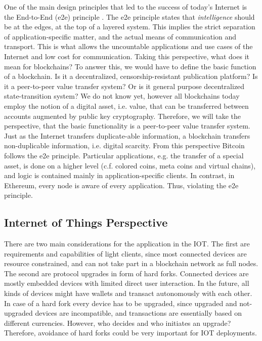 {One of the main design principles that led to the success of today's Internet is the End-to-End (e2e) principle \parencite{Saltzer:1984:EAS:357401.357402}. The e2e principle states that \emph{intelligence} should be at the edges, at the top of a layered system. This implies the strict separation of application-specific matter, and the actual means of communication and transport. This is what allows the uncountable applications and use cases of the Internet and low cost for communication. Taking this perspective, what does it mean for blockchains? To answer this, we would have to define the basic function of a blockchain. Is it a decentralized, censorship-resistant publication platform? Is it a peer-to-peer value transfer system? Or is it general purpose decentralized state-transition system? We do not know yet, however all blockchains today employ the notion of a digital asset, i.e. value, that can be transferred between accounts augmented by public key cryptography. Therefore, we will take the perspective, that the basic functionality is a peer-to-peer value transfer system. Just as the Internet transfers duplicate-able information, a blockchain transfers non-duplicable information, i.e. digital scarcity. From this perspective Bitcoin follows the e2e principle. Particular applications, e.g. the transfer of a special asset, is done on a higher level (c.f. colored coins, meta coins and virtual chains), and logic is contained mainly in application-specific clients. In contrast, in Ethereum, every node is aware of every application. Thus, violating the e2e principle.


\subsection*{Internet of Things Perspective}

There are two main considerations for the application in the \ac{IOT}. The first are requirements and capabilities of light clients, since most connected devices are resource constrained, and can not take part in a blockchain network as full nodes. The second are protocol upgrades in form of hard forks. Connected devices are mostly embedded devices with limited direct user interaction. In the future, all kinds of devices might have wallets and transact autonomously with each other. In case of a hard fork every device has to be upgraded, since upgraded and not-upgraded devices are incompatible, and transactions are essentially based on different currencies. However, who decides and who initiates an upgrade? Therefore, avoidance of hard forks could be very important for \ac{IOT} deployments.

}
